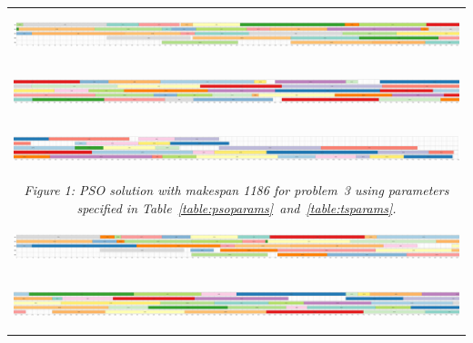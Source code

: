 \documentclass[paper=a4, fontsize=9pt]{scrartcl}
\begin{document}
\begin{multicols}{2}



\end{multicols}


\begin{landscape}
{
\begin{table}
\hspace*{-0.5cm}
\centering
\begin{tabular}{l}
\includegraphics[height=40pt]{figures/solution_pso_instance_3_1_scaled}\\[0.15cm]
\hspace{0.90909pt}\includegraphics[height=40pt]{figures/solution_pso_instance_3_2_scaled}\\[0.15cm]
\hspace{0.90909pt}\includegraphics[height=40pt]{figures/solution_pso_instance_3_3_scaled}\\
\multicolumn{1}{c}{\textit{Figure 1: \acf{PSO} solution with makespan 1186 for problem~3 using parameters specified in Table~\ref{table:psoparams}~and~\ref{table:tsparams}.}}\\[1.2cm]
\includegraphics[height=40pt]{figures/solution_aco_instance_3_1_scaled}\\[0.15cm]
\hspace{0.90909pt}\includegraphics[height=40pt]{figures/solution_aco_instance_3_2_scaled}\\[0.15cm]

\end{tabular}
\end{table}}
\end{landscape}
\end{document}

